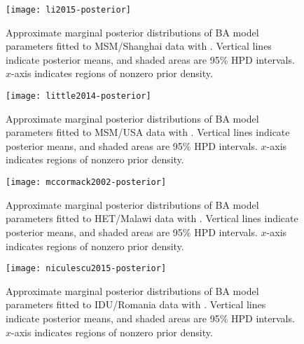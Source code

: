 \begin{figure}[ht]
    \texttt{[image: li2015-posterior]}
    \caption[
        Approximate marginal posterior distributions of \gls{BA} model
        parameters fitted to MSM/Shanghai data with .
    ]{
        Approximate marginal posterior distributions of \gls{BA} model
        parameters fitted to MSM/Shanghai data with . Vertical
        lines indicate posterior means, and shaded areas are 95\% \gls{HPD}
        intervals. $x$-axis indicates regions of nonzero prior density. 
    }
    \label{fig:li}
\end{figure}

\begin{figure}[ht]
    \texttt{[image: little2014-posterior]}
    \caption[
        Approximate marginal posterior distributions of \gls{BA} model
        parameters fitted to MSM/USA data with .
    ]{
        Approximate marginal posterior distributions of \gls{BA} model
        parameters fitted to MSM/USA data with . Vertical
        lines indicate posterior means, and shaded areas are 95\% \gls{HPD}
        intervals. $x$-axis indicates regions of nonzero prior density. 
    }
    \label{fig:little}
\end{figure}

\begin{figure}[ht]
    \texttt{[image: mccormack2002-posterior]}
    \caption[
        Approximate marginal posterior distributions of \gls{BA} model
        parameters fitted to HET/Malawi data with .
    ]{
        Approximate marginal posterior distributions of \gls{BA} model
        parameters fitted to HET/Malawi data with . Vertical
        lines indicate posterior means, and shaded areas are 95\% \gls{HPD}
        intervals. $x$-axis indicates regions of nonzero prior density. 
    }
    \label{fig:mccormack}
\end{figure}

\begin{figure}[ht]
    \texttt{[image: niculescu2015-posterior]}
    \caption[
        Approximate marginal posterior distributions of \gls{BA} model
        parameters fitted to IDU/Romania data with .
    ]{
        Approximate marginal posterior distributions of \gls{BA} model
        parameters fitted to IDU/Romania data with . Vertical
        lines indicate posterior means, and shaded areas are 95\% \gls{HPD}
        intervals. $x$-axis indicates regions of nonzero prior density.
    }
    \label{fig:niculescu}
\end{figure}

